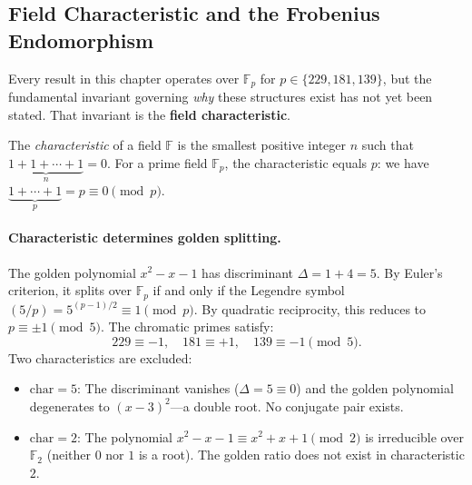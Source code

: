 \subsection{Field Characteristic and the Frobenius Endomorphism}
\label{sec:characteristic}

Every result in this chapter operates over $\mathbb{F}_p$ for $p \in \{229, 181, 139\}$, but the fundamental invariant governing \emph{why} these structures exist has not yet been stated. That invariant is the \textbf{field characteristic}.

\begin{definition}
The \emph{characteristic} of a field $\mathbb{F}$ is the smallest positive integer $n$ such that $\underbrace{1 + 1 + \cdots + 1}_{n} = 0$. For a prime field $\mathbb{F}_p$, the characteristic equals $p$: we have $\underbrace{1 + \cdots + 1}_{p} = p \equiv 0 \pmod{p}$.
\end{definition}

\paragraph{Characteristic determines golden splitting.}
The golden polynomial $x^2 - x - 1$ has discriminant $\Delta = 1 + 4 = 5$. By Euler's criterion, it splits over $\mathbb{F}_p$ if and only if the Legendre symbol $(5/p) = 5^{(p-1)/2} \equiv 1 \pmod{p}$. By quadratic reciprocity, this reduces to $p \equiv \pm 1 \pmod{5}$. The chromatic primes satisfy:
\[
229 \equiv -1, \quad 181 \equiv +1, \quad 139 \equiv -1 \pmod{5}.
\]
Two characteristics are excluded:
\begin{itemize}
\item $\mathrm{char} = 5$: The discriminant vanishes ($\Delta = 5 \equiv 0$) and the golden polynomial degenerates to $(x - 3)^2$---a double root. No conjugate pair exists.
\item $\mathrm{char} = 2$: The polynomial $x^2 - x - 1 \equiv x^2 + x + 1 \pmod{2}$ is irreducible over $\mathbb{F}_2$ (neither $0$ nor $1$ is a root). The golden ratio does not exist in characteristic $2$.
\end{itemize}

